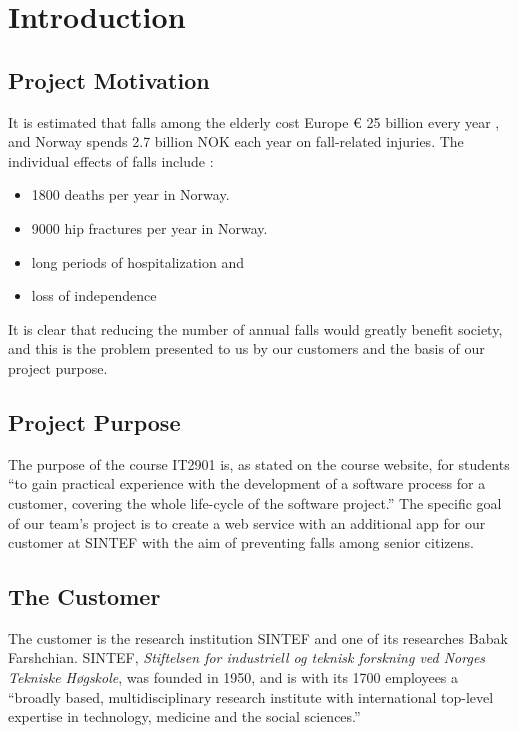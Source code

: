 

\chapter{Introduction}
\section{Project Motivation}
It is estimated that falls among the elderly cost Europe \euro{} 25 billion every year \cite{eupha}, and Norway spends 2.7 billion NOK each year on fall-related injuries. The individual effects of falls include \citep{fallforebygging}: 
\begin{itemize}
  \item 1800 deaths per year in Norway.
  \item 9000 hip fractures per year in Norway.
  \item long periods of hospitalization and
  \item loss of independence
\end{itemize}

It is clear that reducing the number of annual falls would greatly benefit society, and this is the problem presented to us by our customers and the basis of our project purpose.

\section{Project Purpose}
The purpose of the course IT2901 is, as stated on the course website, for students “to gain practical experience with the development of a software process for a customer, covering the whole life-cycle of the software project.”\citep{course} The specific goal of our team’s project is to create a web service with an additional app for our customer at SINTEF with the aim of preventing falls among senior citizens. 

\section{The Customer}

The customer is the research institution SINTEF and one of its researches Babak Farshchian. SINTEF, \textit{Stiftelsen for industriell og teknisk forskning ved Norges Tekniske Høgskole}, was founded in  1950, and is with its 1700 employees a “broadly based, multidisciplinary research institute with international top-level expertise in technology, medicine and the social sciences.”\citep{sintef}

